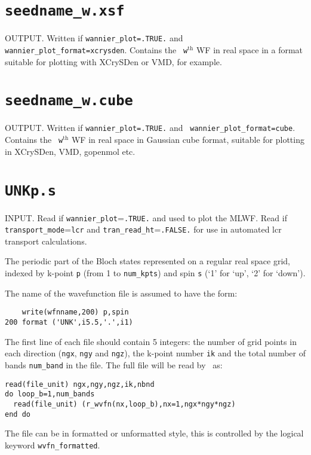 \section{{\tt seedname\_w.xsf}}
OUTPUT. Written if {\tt wannier\_plot=.TRUE.} and {\tt
  wannier\_plot\_format=xcrysden}. Contains the {\tt
  w}$^{\mathrm{th}}$ WF in real space in a format suitable for
  plotting with XCrySDen or VMD, for example.

\section{{\tt seedname\_w.cube}}
OUTPUT. Written if {\tt wannier\_plot=.TRUE.} and {\tt
  wannier\_plot\_format=cube}. Contains the {\tt
  w}$^{\mathrm{th}}$ WF in real space in Gaussian cube format,
  suitable for plotting in XCrySDen, VMD, gopenmol etc.

\section{{\tt UNKp.s}}
INPUT. Read if \verb#wannier_plot#=\verb#.TRUE.# and used to plot the
MLWF. Read if \verb#transport_mode#=\verb#lcr# and \verb#tran_read_ht#=\verb#.FALSE.# 
for use in automated lcr transport calculations.

The periodic part of the Bloch states represented on a regular real
 space grid, indexed by k-point \verb#p# (from 1 to \verb#num_kpts#)
 and spin \verb#s# (`1' for `up', `2' for `down').

The name of the wavefunction file is assumed to have the form:

\begin{verbatim}
    write(wfnname,200) p,spin
200 format ('UNK',i5.5,'.',i1)
\end{verbatim}

The first line of each file should contain 5 integers: the number of
 grid points in each direction (\verb#ngx#, \verb#ngy# and
 \verb#ngz#), the k-point number \verb#ik# and the total number of
 bands \verb#num_band# in the file. The full file will be read by \wannier\ as:

\begin{verbatim}
read(file_unit) ngx,ngy,ngz,ik,nbnd
do loop_b=1,num_bands
  read(file_unit) (r_wvfn(nx,loop_b),nx=1,ngx*ngy*ngz)
end do
\end{verbatim}

The file can be in formatted or unformatted style, this is controlled
by the logical keyword \verb#wvfn_formatted#. 


